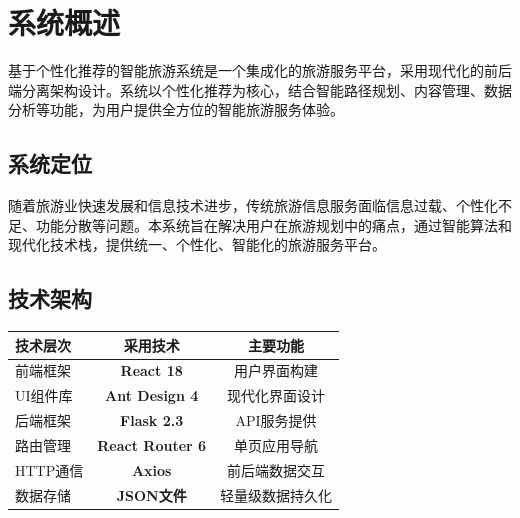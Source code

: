 \documentclass[12pt,a4paper]{article}
\begin{document}
\newpage

\renewcommand{\contentsname}{\color{primary}\Large\textbf{目录}}
\tableofcontents
\newpage

\section{系统概述}

\begin{infobox}[title={系统总体介绍}]
基于个性化推荐的智能旅游系统是一个集成化的旅游服务平台，采用现代化的前后端分离架构设计。系统以个性化推荐为核心，结合智能路径规划、内容管理、数据分析等功能，为用户提供全方位的智能旅游服务体验。
\end{infobox}

\subsection{系统定位}

\begin{reqbox}[title={项目背景与定位}]
随着旅游业快速发展和信息技术进步，传统旅游信息服务面临信息过载、个性化不足、功能分散等问题。本系统旨在解决用户在旅游规划中的痛点，通过智能算法和现代化技术栈，提供统一、个性化、智能化的旅游服务平台。
\end{reqbox}

\subsection{技术架构}

\begin{table}[H]
\centering
\begin{tcolorbox}[
    colback=light,
    colframe=primary,
    title={\textbf{系统技术栈}},
    coltitle=white,
    colbacktitle=primary,
    fonttitle=\bfseries,
    rounded corners=5pt,
    width=0.9\textwidth
]
\begin{tabular}{lcc}
\toprule
\rowcolor{secondary!20}
\textbf{技术层次} & \textbf{采用技术} & \textbf{主要功能} \\
\midrule
前端框架 & \textcolor{primary}{\textbf{React 18}} & 用户界面构建 \\
\rowcolor{light}
UI组件库 & \textcolor{primary}{\textbf{Ant Design 4}} & 现代化界面设计 \\
后端框架 & \textcolor{primary}{\textbf{Flask 2.3}} & API服务提供 \\
\rowcolor{light}
路由管理 & \textcolor{primary}{\textbf{React Router 6}} & 单页应用导航 \\
HTTP通信 & \textcolor{primary}{\textbf{Axios}} & 前后端数据交互 \\
\rowcolor{light}
数据存储 & \textcolor{primary}{\textbf{JSON文件}} & 轻量级数据持久化 \\
\bottomrule
\end{tabular}
\end{tcolorbox}
\end{table}
\end{document}

